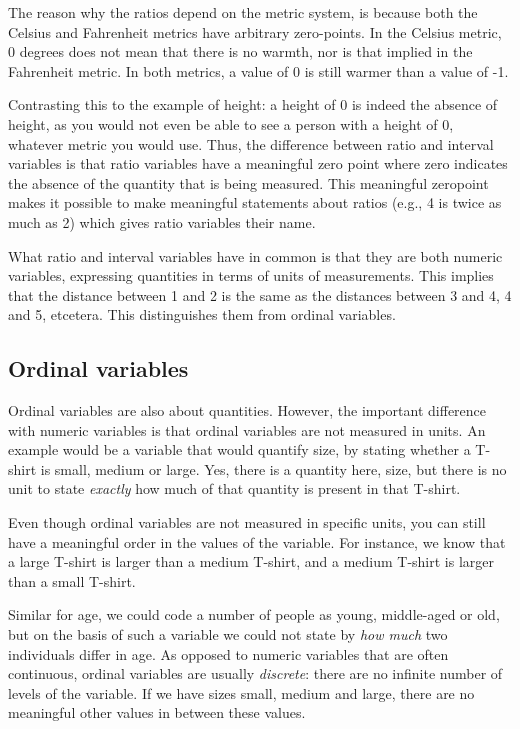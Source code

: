 The reason why the ratios depend on the metric system, is because both the Celsius and Fahrenheit metrics have arbitrary zero-points. In the Celsius metric, 0 degrees does not mean that there is no warmth, nor is that implied in the Fahrenheit metric. In both metrics, a value of 0 is still warmer than a value of -1. 

Contrasting this to the example of height: a height of 0 is indeed the absence of height, as you would not even be able to see a person with a height of 0, whatever metric you would use. Thus, the difference between ratio and interval variables is that ratio variables have a meaningful zero point where zero indicates the absence of the quantity that is being measured. This meaningful zeropoint makes it possible to make meaningful statements about ratios (e.g., 4 is twice as much as 2) which gives ratio variables their name.

What ratio and interval variables have in common is that they are both numeric variables, expressing quantities in terms of units of measurements. This implies that the distance between 1 and 2 is the same as the distances between 3 and 4, 4 and 5, etcetera. This distinguishes them from ordinal variables. 




\subsection{Ordinal variables}

Ordinal variables are also about quantities. However, the important difference with numeric variables is that ordinal variables are not measured in units. An example would be a variable that would quantify size, by stating whether a T-shirt is small, medium or large. Yes, there is a quantity here, size, but there is no unit to state \textit{exactly} how much of that quantity is present in that T-shirt.

Even though ordinal variables are not measured in specific units, you can still have a meaningful order in the values of the variable. For instance, we know that a large T-shirt is larger than a medium T-shirt, and a medium T-shirt is larger than a small T-shirt.

Similar for age, we could code a number of people as young, middle-aged or old, but on the basis of such a variable we could not state by \textit{how much} two individuals differ in age. As opposed to numeric variables that are often continuous, ordinal variables are usually \textit{discrete}: there are no infinite number of levels of the variable. If we have sizes small, medium and large, there are no meaningful other values in between these values.

